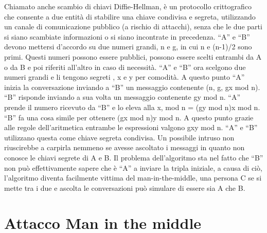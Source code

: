 Chiamato anche scambio di chiavi Diffie-Hellman, è un protocollo crittografico che consente a due entità di stabilire una chiave condivisa e segreta, utilizzando un canale di comunicazione pubblico (a rischio di attacchi), senza che le due parti si siano scambiate informazioni o si siano incontrate in precedenza.
“A” e “B” devono mettersi d’accordo su due numeri grandi, n e g, in cui n e (n-1)/2 sono primi.
Questi numeri possono essere pubblici, possono essere scelti entrambi da A o da B e poi riferiti all’altro in caso di necessità.
“A” e “B” ora scelgono due numeri grandi e li tengono segreti , x e y per comodità.
A questo punto “A” inizia la conversazione inviando a “B” un messaggio contenente (n, g, gx mod n).
“B” risponde inviando a sua volta un messaggio contenente gy mod n. 
“A” prende il numero ricevuto da “B” e lo eleva alla x, mod n = (gy mod n)x mod n. “B” fa una cosa simile per ottenere (gx mod n)y mod n.
A questo punto grazie alle regole dell’aritmetica entrambe le espressioni valgono gxy mod n. “A” e “B” utilizzano questa come chiave segreta condivisa.
Un possibile intruso non riuscirebbe a carpirla nemmeno se avesse ascoltato i messaggi in quanto non conosce le chiavi segrete di A e B.
Il problema dell’algoritmo sta nel fatto che “B” non può effettivamente sapere che è “A” a inviare la tripla iniziale, a causa di ciò, l’algoritmo diventa facilmente vittima del man-in-the-middle, una persona C se si mette tra i due e ascolta le conversazioni può simulare di essere sia A che B.

\section{Attacco Man in the middle}

